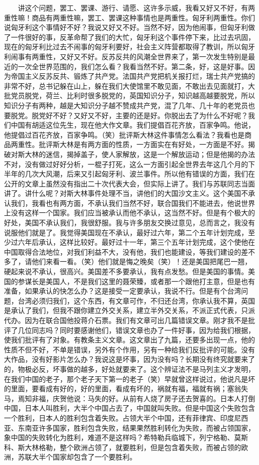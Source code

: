 \documentclass[cn,11pt,chinese]{elegantbook}
\begin{document}
　　讲这个问题，罢工、罢课、游行、请愿、这许多示威，我看又好又不好，有两重性嘛！商品有两重性嘛，罢工、罢课这种事情也是两重性。匈牙利两重性。你们说匈牙利这个事情好不好？我说又好又不好。当然不好，因为他闹事，但匈牙利做了一件很好的事，反革命帮了我们的大忙，匈牙利这个事件停下来，比过去巩固，现在的匈牙利比过去不闹事的匈牙利要好，社会主义阵营都取得了教训，所以匈牙利闹事有两重性，又好又不好。反苏反共的风潮全世界来了，第一次发生特别是最近的一次全世界范围的，我们怎么看？我看当然不好。第二条，好，这是好事。因为帝国主义反苏反共、锻炼了共产党。法国共产党把机关报打烂，瑞士共产党搞的非常不好，总书记躲在山上，躲在我们大使馆里不敢见面，不敢出去见面就打，大批党员脱党，荷兰、比利时很多脱党的，英国知识分子，知识越高越要脱党，所以知识分子有两种，越是大知识分子越不赞成共产党，混了几年、几十年的老党员也要脱党。脱党好不好？又好又不好，主要的还是好。你脱出去了为什么不好呢？我们中国有胡适这位先生，现在他大作文章。我们提倡百花齐放，百家争鸣。他说，他提倡过百花齐放，百家争鸣。（笑）批评斯大林这件事情怎么看法？我看也是商品两重性。批评斯大林是有两方面的性质，一方面实在有好处，一方面是不好。揭破对斯大林的迷信，揭掉盖子，使人家解放，这是一个解放运动；但是他揭的办法不对，没有做过好好分析，一棍子打死，这么一方面引起全世界去年这几个月的下半年的几次大风潮，后来又引起匈牙利、波兰事件。所以他有错误的方面，我们在公开的文章上虽然没有指出二十次代表大会，但实际上讲了。我们与苏联同志当面讲了。讲什么呢？对斯大林事件处理不当，讲他们的大国沙文主义。这个美国不承认我们，我看也有两方面，不承认我们当然不好，联合国我们不能进去，他说世界上没有这样一个国家。我们应当被承认而他不承认，这当然不好。但是有个极大的好处，美国不承认我们，我很舒服。我与许多朋友交换过意见，总而言之，我没有说服他们就是了。我觉得美国现在不承认，最好过六年，第二个五年计划完成，至少过六年后承认，这样比较好。最好过十一年，第三个五年计划完成，这个使他在中国取得合法地位，对我们利益不大，没有他，我们也能建设，等我们建设的差不多了，请他们来看一看。（笑）他们就是悔之晚矣（笑）！还是美国把尾巴一翘，硬起来说不承认，很高兴。美国差不多要承认，我有点发愁。但是美国的事情。美国的参谋长是美国人，不是我们这里的聂荣臻，或者那一个跟他打主意，但是也有准备，如果承认的快怎么办？这是接受一定要承认，我说不行。但是有个台湾问题，台湾必须归我们，这个东西，有文章可作，不归还台湾，你承认我不算，英国是承认了我们，但我不跟你建立外交关系，建立半外交关系，不派正式代表，只派代办。因为在联合国他投蒋介石票。我们有文章可出几篇错误文章。刚才我不是批评了几位同志吗？同时要感谢他们，错误文章也办了一件好事，因为给我们根据，使我们批评有了对象。有教条主义文章。这文章出了九篇，还要多出现一点，他的性质不但不好，不单是错误，另外有个作用，另有一种给我们反批评的可能。没有大作品，没有好影片怎么办？我说这是坏事，因为没有吗？长期没有终究就要来了的，物极必反，坏事做的越多，好处就要来了。这个辨证法不是马列主义才发明，在我们中国的老子，那个老子天下第一的老子（笑）早就曾这样说过，他说凡是坏的里面，要看成有好的，好的里面，看成有坏的，祸就有福，福就有祸；塞翁失马，焉知非福，庆贺他说：马失的好。从前有人烧了房子还去贺喜的。日本人打倒中国，日本人叫胜利，大半个中国占去了，中国就叫失败。但是中国这个失败包含一个胜利，日本人的胜利包含着失败。占领大半个中国，还有菲律宾、印度尼西亚、东南亚许多国家，胜利包含失败，结果果然胜利转化为失败，而被占领国家，象中国的失败转化为胜利，难道不是这样吗？希特勒兵临城下，列宁格勒、莫斯科、斯大林格勒，整个欧洲占领了，就要胜利，但是包含着失败，而被占领的欧洲，苏联大半个国家却包含了一个要胜利。\\
\end{document}
